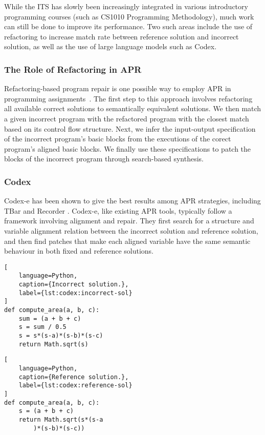 While the ITS has slowly been increasingly integrated in various introductory
programming courses (such as CS1010 Programming Methodology), much work can still be done
to improve its performance.
Two such areas include the use of refactoring to increase match rate between reference
solution and incorrect solution, as well as the use of large language models such as Codex.

\subsubsection{The Role of Refactoring in APR}

Refactoring-based program repair is one possible way to employ APR in programming
assignments~\cite{hu2019re}.
The first step to this approach involves refactoring all available correct solutions to
semantically equivalent solutions.
We then match a given incorrect program with the refactored program with the closest match
based on its control flow structure.
Next, we infer the input-output specification of the incorrect program's basic blocks
from the executions of the corect program's aligned basic blocks.
We finally use these specifications to patch the blocks of the incorrect program through
search-based synthesis.

\subsubsection{Codex}
\label{background:codex}

Codex-e has been shown to give the best results among APR strategies, including TBar and Recorder
\cite{fan2022improving}.
Codex-e, like existing APR tools, typically follow a framework involving alignment and repair.
They first search for a structure and variable alignment relation between the incorrect solution
and reference solution, and then find patches that make each aligned variable have the same
semantic behaviour in both fixed and reference solutions.

\begin{multicols}{2}
\begin{lstlisting}[
    language=Python,
    caption={Incorrect solution.},
    label={lst:codex:incorrect-sol}
]
def compute_area(a, b, c):
    sum = (a + b + c)
    s = sum / 0.5
    s = s*(s-a)*(s-b)*(s-c)
    return Math.sqrt(s)
\end{lstlisting}

\columnbreak

\begin{lstlisting}[
    language=Python,
    caption={Reference solution.},
    label={lst:codex:reference-sol}
]
def compute_area(a, b, c):
    s = (a + b + c)
    return Math.sqrt(s*(s-a
        )*(s-b)*(s-c))
\end{lstlisting}
\end{multicols}

